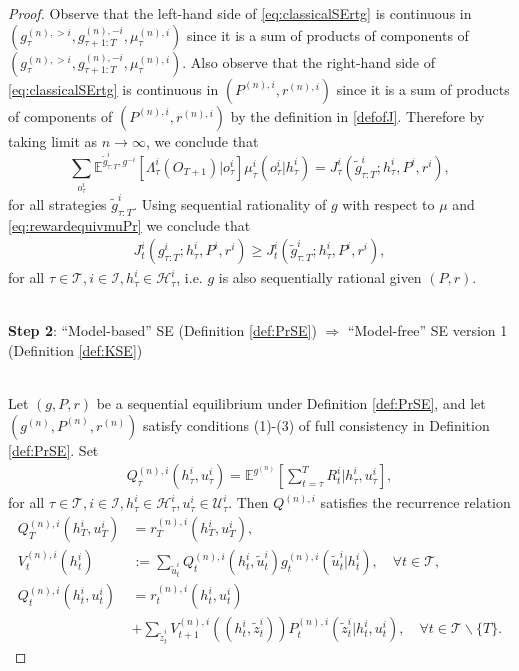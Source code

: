 \documentclass[pdflatex,sn-basic]{sn-jnl}
\newcommand{\E}{\mathbb{E}}
\newcommand{\Qfunc}{Q}
\theoremstyle{thmstyleone}%
\theoremstyle{thmstyletwo}%
\theoremstyle{thmstylethree}%
\begin{document}
\begin{appendices}
\begin{proof}
		Observe that the left-hand side of \eqref{eq:classicalSErtg} is continuous in $(g_{\tau}^{(n), >i}, g_{\tau+1:T}^{(n), -i}, \mu_\tau^{(n), i})$ since it is a sum of products of components of $(g_{\tau}^{(n), >i}, g_{\tau+1:T}^{(n), -i}, \mu_\tau^{(n), i})$. Also observe that the right-hand side of \eqref{eq:classicalSErtg} is continuous in $(P^{(n), i}, r^{(n), i})$ since it is a sum of products of components of $(P^{(n), i}, r^{(n), i})$ by the definition in \eqref{defofJ}.
		Therefore by taking limit as $n\rightarrow\infty$, we conclude that
		\begin{equation}
			\sum_{o_\tau^i}\E^{\tilde{g}_{\tau:T}^i, g^{-i}} [\Lambda_\tau^i(O_{T+1})|o_\tau^i]\mu_\tau^{i}(o_\tau^i|h_\tau^i) = J_\tau^i(\tilde{g}_{\tau:T}^i; h_\tau^i, P^{i}, r^{i}),\label{eq:rewardequivmuPr}
		\end{equation} 
		for all strategies $\tilde{g}_{\tau:T}^i$. Using sequential rationality of $g$ with respect to $\mu$ and \eqref{eq:rewardequivmuPr} we conclude that
		\begin{align}
			J_t^i(g_{\tau:T}^i; h_\tau^i, P^{i}, r^{i}) \geq  J_t^i(\tilde{g}_{\tau:T}^i; h_\tau^i, P^{i}, r^{i}),
		\end{align}
		for all $\tau\in \mathcal{T}, i\in\mathcal{I}, h_\tau^i \in\mathcal{H}_\tau^i$, i.e. $g$ is also sequentially rational given $(P, r)$.\\~
		
		\textbf{Step 2}: ``Model-based'' SE (Definition \ref{def:PrSE}) $\Rightarrow$ ``Model-free'' SE version 1 (Definition \ref{def:KSE})\\~
		
		Let $(g, P, r)$ be a sequential equilibrium under Definition \ref{def:PrSE}, and let $(g^{(n)}, P^{(n)}, r^{(n)})$ satisfy conditions (1)-(3) of full consistency in Definition \ref{def:PrSE}. Set
		\begin{align}
			\Qfunc_\tau^{(n), i}(h_\tau^i, u_{\tau}^i) = \E^{g^{(n)}}\left[\sum_{t=\tau}^T R_t^i\Big|h_\tau^i, u_{\tau}^i \right], 
		\end{align} 
		for all $\tau\in \mathcal{T}, i\in\mathcal{I}, h_\tau^i \in\mathcal{H}_\tau^i, u_\tau^i\in\mathcal{U}_\tau^i$. Then $\Qfunc^{(n), i}$ satisfies the recurrence relation 
        \begin{subequations}
		\begin{align}
			\Qfunc_T^{(n), i}(h_T^i, u_T^i) &= r_T^{(n), i}(h_T^i, u_T^i),\\
			V_t^{(n), i}(h_t^i) &:= \sum_{\tilde{u}_t^i} \Qfunc_t^{(n), i}(h_t^i, \tilde{u}_t^i)g_t^{(n), i}(\tilde{u}_t^i|h_t^i), \quad \forall t\in\mathcal{T},\\
			\Qfunc_{t}^{(n), i}(h_t^i, u_t^i) &= r_t^{(n), i}(h_t^i, u_t^i) \\
			&+ \sum_{\tilde{z}_{t}^i} V_{t+1}^{(n), i}((h_t^i, \tilde{z}_{t}^i)) P_t^{(n), i}(\tilde{z}_{t}^i|h_t^i, u_t^i),\quad \forall t\in\mathcal{T}\backslash\{T\}.
		\end{align}
        \end{subequations}
	

\end{proof}
\end{appendices}
\end{document}
